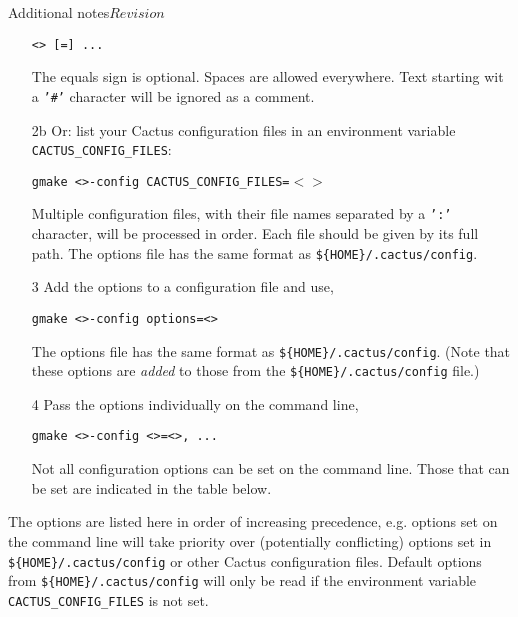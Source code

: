 \begin{cactuspart}{Additional notes}{}{$Revision$}
\begin{enumerate}
    \texttt{<> [=] ...}

    The equals sign is optional. Spaces are allowed everywhere.
    Text starting wit a \texttt{'\#'} character will be ignored as a comment.

  \item[2b]{}
    Or: list your Cactus configuration files in an environment variable
    \texttt{CACTUS\_CONFIG\_FILES}:

    \texttt{gmake <>-config
                  CACTUS\_CONFIG\_FILES=$<$$>$}

    Multiple configuration files, with their file names separated by a
    \texttt{':'} character, will be processed in order.
    Each file should be given by its full path.
    The options file has the same format as \texttt{\$\{HOME\}/.cactus/config}.

  \item[3]{}
    Add the options to a configuration file and use,

    \texttt{gmake <>-config  options=<>}

    The options file has the same format as \texttt{\$\{HOME\}/.cactus/config}.
    (Note that these options are \emph{added} to those from the
    \texttt{\$\{HOME\}/.cactus/config} file.)

  \item[4]{}
    Pass the options individually on the command line,

    \texttt{gmake <>-config
                           <>=<>, ...}

    Not all configuration options can be set on the command line.
    Those that can be set are indicated in the table below.
\end{enumerate}

The options are listed here in order of increasing precedence, e.g. options
set on the command line will take priority over (potentially
conflicting) options set in \texttt{\$\{HOME\}/.cactus/config} or other
Cactus configuration files. Default options from
\texttt{\$\{HOME\}/.cactus/config} will only be read if the
environment variable \texttt{CACTUS\_CONFIG\_FILES} is not set.


\end{cactuspart}
